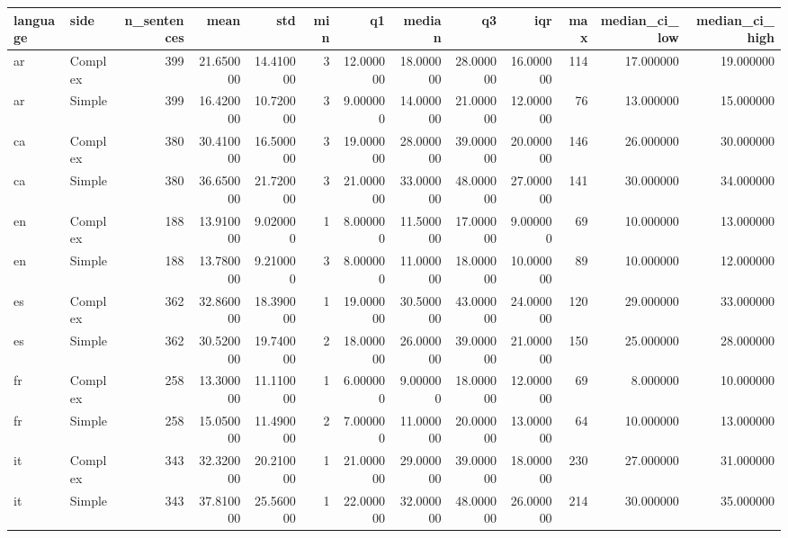 \begin{tabular}{llrrrrrrrrrrr}
\toprule
language & side & n_sentences & mean & std & min & q1 & median & q3 & iqr & max & median_ci_low & median_ci_high \\
\midrule
ar & Complex & 399 & 21.650000 & 14.410000 & 3 & 12.000000 & 18.000000 & 28.000000 & 16.000000 & 114 & 17.000000 & 19.000000 \\
ar & Simple & 399 & 16.420000 & 10.720000 & 3 & 9.000000 & 14.000000 & 21.000000 & 12.000000 & 76 & 13.000000 & 15.000000 \\
ca & Complex & 380 & 30.410000 & 16.500000 & 3 & 19.000000 & 28.000000 & 39.000000 & 20.000000 & 146 & 26.000000 & 30.000000 \\
ca & Simple & 380 & 36.650000 & 21.720000 & 3 & 21.000000 & 33.000000 & 48.000000 & 27.000000 & 141 & 30.000000 & 34.000000 \\
en & Complex & 188 & 13.910000 & 9.020000 & 1 & 8.000000 & 11.500000 & 17.000000 & 9.000000 & 69 & 10.000000 & 13.000000 \\
en & Simple & 188 & 13.780000 & 9.210000 & 3 & 8.000000 & 11.000000 & 18.000000 & 10.000000 & 89 & 10.000000 & 12.000000 \\
es & Complex & 362 & 32.860000 & 18.390000 & 1 & 19.000000 & 30.500000 & 43.000000 & 24.000000 & 120 & 29.000000 & 33.000000 \\
es & Simple & 362 & 30.520000 & 19.740000 & 2 & 18.000000 & 26.000000 & 39.000000 & 21.000000 & 150 & 25.000000 & 28.000000 \\
fr & Complex & 258 & 13.300000 & 11.110000 & 1 & 6.000000 & 9.000000 & 18.000000 & 12.000000 & 69 & 8.000000 & 10.000000 \\
fr & Simple & 258 & 15.050000 & 11.490000 & 2 & 7.000000 & 11.000000 & 20.000000 & 13.000000 & 64 & 10.000000 & 13.000000 \\
it & Complex & 343 & 32.320000 & 20.210000 & 1 & 21.000000 & 29.000000 & 39.000000 & 18.000000 & 230 & 27.000000 & 31.000000 \\
it & Simple & 343 & 37.810000 & 25.560000 & 1 & 22.000000 & 32.000000 & 48.000000 & 26.000000 & 214 & 30.000000 & 35.000000 \\
\bottomrule
\end{tabular}
